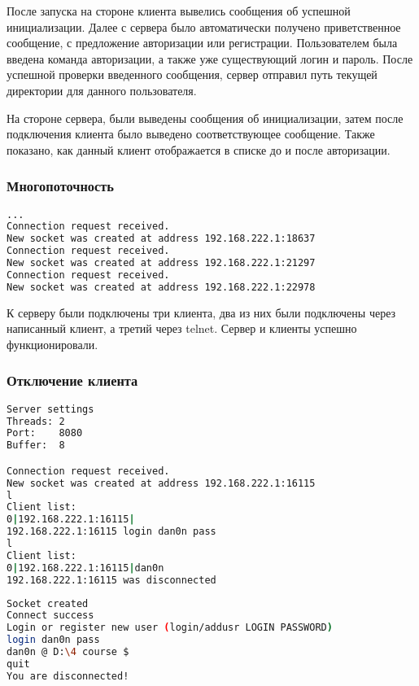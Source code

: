 После запуска на стороне клиента вывелись сообщения об успешной инициализации. Далее с сервера было автоматически получено приветственное сообщение, с предложение авторизации или регистрации. Пользователем была введена команда авторизации, а также уже существующий логин и пароль. После успешной проверки введенного сообщения, сервер отправил путь текущей директории для данного пользователя.

На стороне сервера, были выведены сообщения об инициализации, затем после подключения клиента было выведено соответствующее сообщение. Также показано, как данный клиент отображается в списке до и после авторизации.

\subsubsection{Многопоточность}

\begin{lstlisting}[language=bash, caption=Лог сервера]
...
Connection request received.
New socket was created at address 192.168.222.1:18637
Connection request received.
New socket was created at address 192.168.222.1:21297
Connection request received.
New socket was created at address 192.168.222.1:22978
\end{lstlisting}

К серверу были подключены три клиента, два из них были подключены через написанный
клиент, а третий через telnet. Сервер и клиенты успешно функционировали.

\subsubsection{Отключение клиента}

\begin{lstlisting}[language=bash, caption=Лог сервера]
Server settings
Threads: 2
Port:    8080
Buffer:  8

Connection request received.
New socket was created at address 192.168.222.1:16115
l
Client list:
0|192.168.222.1:16115|
192.168.222.1:16115 login dan0n pass
l
Client list:
0|192.168.222.1:16115|dan0n
192.168.222.1:16115 was disconnected
\end{lstlisting}

\begin{lstlisting}[language=bash, caption=Лог клиента]
Socket created
Connect success
Login or register new user (login/addusr LOGIN PASSWORD)
login dan0n pass
dan0n @ D:\4 course $
quit
You are disconnected!
\end{lstlisting}

